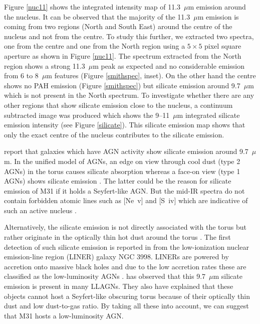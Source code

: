 Figure \ref{nuc11} shows the integrated intensity map of 11.3~$\mu$m emission around the nucleus. It can be observed that the majority of the 11.3~$\mu$m 
emission is coming from two regions (North and South East) around the centre of the nucleus and not from the centre. To study this further, we extracted two 
spectra, one from the centre and one from the North region using a $5 \times 5$ pixel square aperture as shown in Figure \ref{nuc11}. The spectrum extracted 
from the North region shows a strong 11.3~$\mu$m peak as expected and no considerable emission from 6 to 8~$\mu$m features (Figure \ref{smithspec}, inset). 
On the other hand the centre shows no PAH emission (Figure \ref{smithspec}) but silicate emission around 9.7~$\mu$m which is not present in the North spectrum. 
To investigate whether there are any other regions that show silicate emission close to the nucleus, a continuum subtracted image was produced which shows the 
9--11~$\mu$m integrated silicate emission intensity (see Figure \ref{silicate}). This silicate emission map shows that only the exact centre of the nucleus contributes 
to the silicate emission. 

\citet{Spoon2007} report that galaxies which have AGN activity show silicate emission around 9.7~$\mu$m.
In the unified model of AGNs, an edge on view through cool dust (type 2 AGNs) in the torus causes silicate absorption whereas a face-on view (type 1 AGNs) 
shows silicate emission \citep{AGNtypes1995}. The latter could be the reason for silicate emission of M31 if it holds a Seyfert-like AGN. 
But the mid-IR spectra do not contain forbidden atomic lines such as [Ne~{\sc v}] and [S~{\sc iv}] which are indicative of such an active nucleus \citep{AGNref}.

 Alternatively, the silicate emission is not directly associated with the torus but rather originate in the optically thin hot dust around the torus \citep{Mason2012}. 
 The first detection of such silicate emission is reported in \citet{Sturm2005} from the low-ionization nuclear emission-line region (LINER) galaxy NGC 3998. 
 LINERs are powered by accretion onto massive black holes and due to the low accretion rates these are classified as the low-luminosity AGNs \citep{Kewley2006}. 
 \citealt{Mason2012} has observed that this 9.7~$\mu$m silicate emission is present in many LLAGNs. They also have explained that these objects cannot 
 host a Seyfert-like obscuring torus because of their optically thin dust and low dust-to-gas ratio. By taking all these into account, we can suggest that M31 
 hosts a low-luminosity AGN. 

